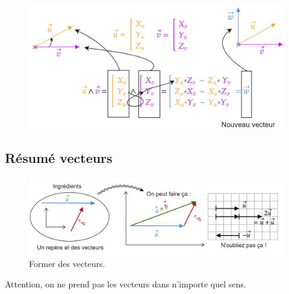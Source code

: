 \documentclass[
	11pt, %
	fleqn, %
	a4paper, %
]{LegrandOrangeBook}
\begin{document}
\begin{figure}[H] %
	\centering %
	\includegraphics[width=1\textwidth]{Images/vecto1.png} %
\end{figure}




















\subsection{Résumé vecteurs}

\begin{figure}[H] %
	\centering %
	\includegraphics[width=1\textwidth]{Images/vec10.png} %
	\caption{Former des vecteurs.}
	\label{vec10} %
\end{figure}

Attention, on ne prend pas les vecteurs dans n'importe quel sens.
\end{document}
